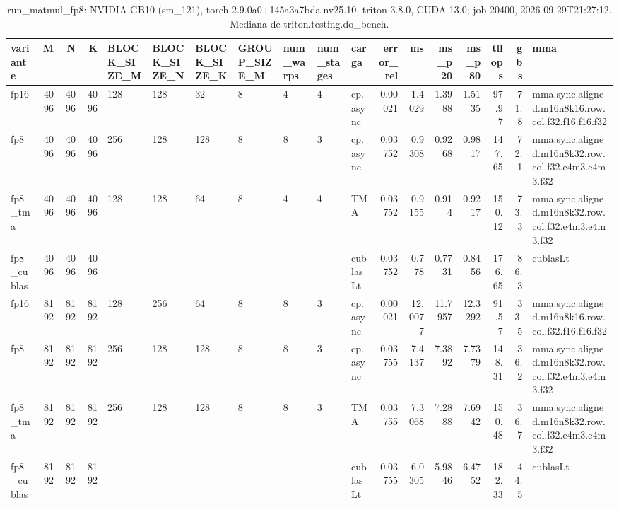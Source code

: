\begin{table}[htbp]
  \centering\small
  \begin{tabular}{lrrrlllllllrrrrrrl}
    \toprule
    variante & M & N & K & BLOCK\_SIZE\_M & BLOCK\_SIZE\_N & BLOCK\_SIZE\_K & GROUP\_SIZE\_M & num\_warps & num\_stages & carga & error\_rel & ms & ms\_p20 & ms\_p80 & tflops & gbs & mma \\
    \midrule
    fp16 & 4096 & 4096 & 4096 & 128 & 128 & 32 & 8 & 4 & 4 & cp.async & 0.00021 & 1.4029 & 1.3988 & 1.5135 & 97.97 & 71.8 & mma.sync.aligned.m16n8k16.row.col.f32.f16.f16.f32 \\
    fp8 & 4096 & 4096 & 4096 & 256 & 128 & 128 & 8 & 8 & 3 & cp.async & 0.03752 & 0.9308 & 0.9268 & 0.9817 & 147.65 & 72.1 & mma.sync.aligned.m16n8k32.row.col.f32.e4m3.e4m3.f32 \\
    fp8\_tma & 4096 & 4096 & 4096 & 128 & 128 & 64 & 8 & 4 & 4 & TMA & 0.03752 & 0.9155 & 0.914 & 0.9217 & 150.12 & 73.3 & mma.sync.aligned.m16n8k32.row.col.f32.e4m3.e4m3.f32 \\
    fp8\_cublas & 4096 & 4096 & 4096 &  &  &  &  &  &  & cublasLt & 0.03752 & 0.778 & 0.7731 & 0.8456 & 176.65 & 86.3 & cublasLt \\
    fp16 & 8192 & 8192 & 8192 & 128 & 256 & 64 & 8 & 8 & 3 & cp.async & 0.00021 & 12.0077 & 11.7957 & 12.3292 & 91.57 & 33.5 & mma.sync.aligned.m16n8k16.row.col.f32.f16.f16.f32 \\
    fp8 & 8192 & 8192 & 8192 & 256 & 128 & 128 & 8 & 8 & 3 & cp.async & 0.03755 & 7.4137 & 7.3892 & 7.7379 & 148.31 & 36.2 & mma.sync.aligned.m16n8k32.row.col.f32.e4m3.e4m3.f32 \\
    fp8\_tma & 8192 & 8192 & 8192 & 256 & 128 & 128 & 8 & 8 & 3 & TMA & 0.03755 & 7.3068 & 7.2888 & 7.6942 & 150.48 & 36.7 & mma.sync.aligned.m16n8k32.row.col.f32.e4m3.e4m3.f32 \\
    fp8\_cublas & 8192 & 8192 & 8192 &  &  &  &  &  &  & cublasLt & 0.03755 & 6.0305 & 5.9846 & 6.4752 & 182.33 & 44.5 & cublasLt \\
    \bottomrule
  \end{tabular}
  \caption{run\_matmul\_fp8: NVIDIA GB10 (sm\_121), torch 2.9.0a0+145a3a7bda.nv25.10, triton 3.8.0, CUDA 13.0; job 20400, 2026-09-29T21:27:12. Mediana de triton.testing.do\_bench.}
  \label{tab:experimento-fp8}
\end{table}
